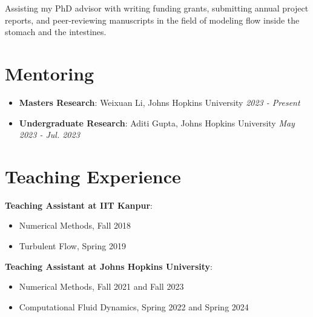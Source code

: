 \documentclass[11pt]{article}
\begin{document}
\vspace{4mm}

\noindent Assisting my PhD advisor with writing funding grants, submitting annual project reports, and peer-reviewing manuscripts in the field of modeling flow inside the stomach and the intestines.

\vspace{6mm}

\section*{Mentoring}

\begin{itemize}[leftmargin=*,itemsep=1pt]
    \item \textbf{Masters Research}: Weixuan Li, Johns Hopkins University \hfill \textit{2023 - Present}
    \item \textbf{Undergraduate Research}: Aditi Gupta, Johns Hopkins University \hfill \textit{May 2023 - Jul. 2023}
\end{itemize}

\vspace{6mm}

\section*{Teaching Experience}

\noindent\textbf{Teaching Assistant at IIT Kanpur}:
\begin{itemize}[leftmargin=*,itemsep=1pt]
    \item Numerical Methods, Fall 2018
    \item Turbulent Flow, Spring 2019
\end{itemize}

\vspace{4mm}

\noindent\textbf{Teaching Assistant at Johns Hopkins University}:
\begin{itemize}[leftmargin=*,itemsep=1pt]
    \item Numerical Methods, Fall 2021 and Fall 2023
    \item Computational Fluid Dynamics, Spring 2022 and Spring 2024
\end{itemize}
\end{document}
